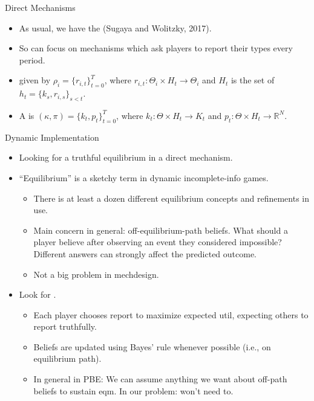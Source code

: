 \documentclass[english,10pt
,aspectratio=169
]{beamer}
\begin{document}
\begin{frame}{Direct Mechanisms}
\begin{itemize}
	\item As usual, we have the  (Sugaya and Wolitzky, 2017).
	\item So can focus on mechanisms which ask players to report their types every period.
	\item {} given by $\rho_i = \{r_{i,t}\}_{t=0}^T$, where $r_{i,t}: \Theta_i \times H_t \to \Theta_i$ and $H_t$ is the set of  $h_t = \{k_s,r_{i,s}\}_{s < t}$.
	\item A  is $(\kappa,\pi) = \{k_t,p_t\}_{t=0}^T$, where $k_t: \Theta \times H_t \to K_t$ and $p_t: \Theta \times H_t \to \mathbb{R}^N$.
\end{itemize}
\end{frame}


\begin{frame}{Dynamic Implementation}
\begin{itemize}
	\item Looking for a truthful equilibrium in a direct mechanism.
	\item ``Equilibrium'' is a sketchy term in dynamic incomplete-info games.
	\begin{itemize}
		\item There is at least a dozen different equilibrium concepts and refinements in use.
		\item Main concern in general: off-equilibrium-path beliefs. What should a player believe after observing an event they considered impossible? Different answers can strongly affect the predicted outcome.
		\item Not a big problem in mechdesign.
	\end{itemize}
	\item Look for .
	\begin{itemize}
		\item Each player chooses report to maximize expected util, expecting others to report truthfully.
		\item Beliefs are updated using Bayes' rule whenever possible (i.e., on equilibrium path).
		\item In general in PBE: We can assume anything we want about off-path beliefs to sustain eqm. In our problem: won't need to.
	\end{itemize}
\end{itemize}
\end{frame}
\end{document}
